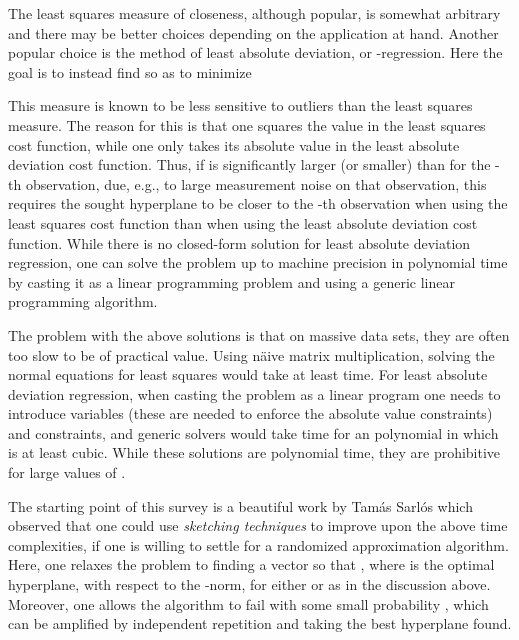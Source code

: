 \documentclass[11pt]{article}
\begin{document}
The least squares measure of closeness, although popular, is somewhat arbitrary and 
there may be better choices depending on the application at hand. Another popular
choice is the method of least absolute deviation, or -regression. Here
the goal is to instead find  so as to minimize 
 
This measure is known 
to be less sensitive to outliers
than the least squares measure. The reason for this is that one squares
the value  in the least squares cost function, while one
only takes its absolute value in the least absolute deviation cost function. Thus,
if  is significantly larger (or smaller) than  for the 
-th observation, due, e.g., to large measurement noise on that observation, this
requires the sought hyperplane  to be closer to the -th observation 
when using the least squares cost function than when using the least absolute deviation
cost function. While there is no closed-form solution for least absolute deviation
regression, one can solve the problem up to machine precision in polynomial time
by casting it as a linear programming problem and using a generic linear programming
algorithm.

The problem with the above solutions is that on massive data sets, they are
often too slow to be of practical value. Using n\"aive matrix multiplication,
solving the normal equations for least squares would take at least 
time. For least absolute deviation regression, when casting the problem as a linear
program one needs to introduce  variables (these are needed to enforce the absolute
value constraints) and  constraints, and generic solvers would take 
 time for an polynomial in  which is at least cubic. 
While these solutions are polynomial time, they are prohibitive for 
large values of . 

The starting point of this survey is a beautiful work by Tam\'{a}s Sarl\'os \cite{S06} which
observed that one could use {\it sketching techniques} to improve upon the
above time complexities, if one is willing to settle for a randomized approximation
algorithm. Here, one relaxes the problem to finding a vector  so that
, where  is the optimal hyperplane, 
with respect to the -norm, for  either  or  as in the discussion above.
Moreover, one allows the algorithm to fail with some small probability , 
which can be amplified by independent repetition and taking the best hyperplane found.
\end{document}
